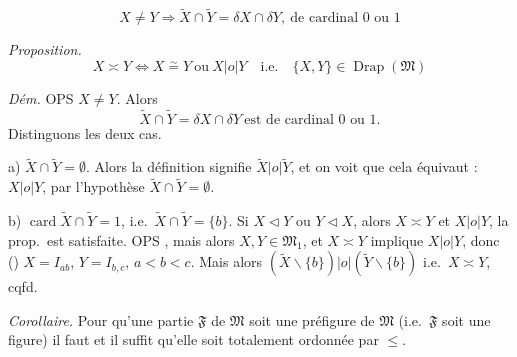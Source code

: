 \documentclass[11pt,a4paper]{article}
\begin{document}
\[
  X \neq Y \Longrightarrow \widetilde{X} \cap \widetilde{Y} = \delta X \cap \delta Y , \ \text{de cardinal } 0 \text{ ou } 1
\]



\emph{Proposition.}
\[
  X \asymp Y \iff X \overset{\sim}{=} Y \ \text{ou} \ X \mathrel{|o|} Y \quad \text{i.e.} \quad \{X, Y\} \in \operatorname{Drap}(\mathfrak{M})
\]

\emph{\struck{\ill{}} Dém.} OPS $X \neq Y$. Alors
\[
  \widetilde{X} \cap \widetilde{Y} = \delta X \cap \delta Y \ \text{est de cardinal } 0 \text{ ou } 1 .
\]
Distinguons les deux cas.

a) $\widetilde{X} \cap \widetilde{Y} = \emptyset$. Alors la définition  signifie $\widetilde{X} \mathrel{|o|} \widetilde{Y}$, et on voit que cela équivaut  : $X \mathrel{|o|} Y$, par l'hypothèse \struck{\ill{}} $\widetilde{X} \cap \widetilde{Y} = \emptyset$.

b) $\operatorname{card} \widetilde{X} \cap \widetilde{Y} = 1$, i.e.\ $\widetilde{X} \cap \widetilde{Y} = \{b\}$.   Si $X \lhd Y$ ou $Y \lhd X$, alors $X \asymp Y$ et $X \mathrel{|o|} Y$, la prop.\ est satisfaite. OPS  \ill{} , \struck{\ill{}} mais alors $X, Y \in \mathfrak{M}_1$, \struck{\ill{}} et $X \asymp Y$  implique $X \mathrel{|o|} Y$, \struck{\ill{}} donc () $X = I_{ab}$, $Y = I_{b,c}$, $a < b < c$. Mais alors $(\widetilde{X} \smallsetminus \{b\}) \mathrel{|o|} (\widetilde{Y} \smallsetminus \{b\})$ i.e.\ $X \asymp Y$, cqfd.

\emph{Corollaire.} Pour qu'une partie  $\mathfrak{F}$ de $\mathfrak{M}$ soit une préfigure de $\mathfrak{M}$ (i.e.\ $\mathfrak{F}$ soit une figure) il faut et il suffit qu'elle soit totalement ordonnée par $\leq$.

\end{document}
